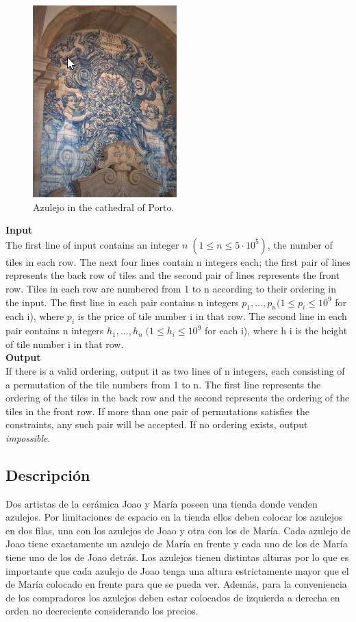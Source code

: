\documentclass{report}
\begin{document}
\begin{figure}[h]
	\begin{center}\includegraphics[scale=0.45]{Azulejos}\end{center}
	\caption{Azulejo in the cathedral of Porto.}	
	\label{Azulejos}
\end{figure}

{\bf Input}\\
The first line of input contains an integer $n\; (1 \leq n \leq 5 \cdot 10^5)$, the number of tiles in each row. The next
four lines contain n integers each; the first pair of lines represents the back row of tiles and the second
pair of lines represents the front row. Tiles in each row are numbered from 1 to n according to their
ordering in the input. The first line in each pair contains n integers $p_1, \ldots, p_n (1 \leq p_i \leq 10^9$ for each
i), where $p_i$ is the price of tile number i in that row. The second line in each pair contains n integers
$h_1,\ldots , h_n \;(1 \leq h_i \leq 10^9$ for each i), where h i is the height of tile number i in that row.\\
{\bf Output}\\
If there is a valid ordering, output it as two lines of n integers, each consisting of a permutation of the
tile numbers from 1 to n. The first line represents the ordering of the tiles in the back row and the second
represents the ordering of the tiles in the front row. If more than one pair of permutations satisfies the
constraints, any such pair will be accepted. If no ordering exists, output {\it impossible}.
\subsection{Descripci\'on}
Dos artistas de la cer\'amica Joao y Mar\'ia poseen una tienda donde venden azulejos. Por limitaciones de espacio en la tienda ellos deben colocar los azulejos en dos filas, una con los azulejos de Joao y otra con los de Mar\'ia. Cada azulejo de Joao tiene exactamente un azulejo de Mar\'ia en frente y cada uno de los de Mar\'ia tiene uno de los de Joao detr\'as. Los azulejos tienen distintas alturas por lo que es importante que cada azulejo de Joao tenga una altura estrictamente mayor que el de Mar\'ia colocado en frente para que se pueda ver. Adem\'as, para la conveniencia de los compradores los azulejos deben estar colocados de izquierda a derecha en orden no decreciente considerando los precios.\\
\end{document}
